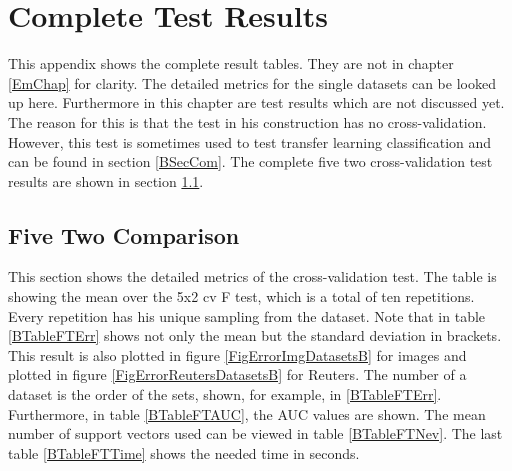 \chapter{Complete Test Results}\label{appaB}
This appendix shows the complete result tables.
They are not in chapter \ref{EmChap} for clarity.
The detailed metrics for the single datasets can be looked up here.
Furthermore in this chapter are test results which are not discussed yet. 
The reason for this is that the test in his construction has no cross-validation.
However, this test is sometimes used to test transfer learning classification \cite{Long.} and can be found in section \ref{BSecCom}.
The complete five two cross-validation test results are shown in section \ref{BSecFT}.

\section{Five Two Comparison}\label{BSecFT}
This section shows the detailed metrics of the cross-validation test.
The table is showing the mean over the 5x2 cv F test, which is a total of ten repetitions.
Every repetition has his unique sampling from the dataset. 
Note that in table \ref{BTableFTErr} shows not only the mean but the standard deviation in brackets.
This result is also plotted in figure \ref{FigErrorImgDatasetsB} for images and plotted in figure \ref{FigErrorReutersDatasetsB} for Reuters.
The number of a dataset is the order of the sets, shown, for example, in \ref{BTableFTErr}.
Furthermore, in table \ref{BTableFTAUC}, the \acs{AUC} values are shown. 
The mean number of support vectors used can be viewed in table \ref{BTableFTNev}.
The last table \ref{BTableFTTime} shows the needed time in seconds.  
